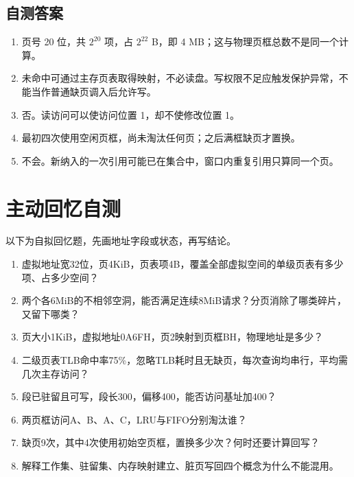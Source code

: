 \subsection{自测答案}\label{OS03-auto-6}

\begin{enumerate}
\def\labelenumi{\arabic{enumi}.}
\tightlist
\item
  页号 20 位，共 \(2^{20}\) 项，占 \(2^{22}\) B，即 4 MB；这与物理页框总数不是同一个计算。
\item
  未命中可通过主存页表取得映射，不必读盘。写权限不足应触发保护异常，不能当作普通缺页调入后允许写。
\item
  否。读访问可以使访问位置 1，却不使修改位置 1。
\item
  最初四次使用空闲页框，尚未淘汰任何页；之后满框缺页才置换。
\item
  不会。新纳入的一次引用可能已在集合中，窗口内重复引用只算同一个页。
\end{enumerate}

\section{主动回忆自测}\label{OS03-recall}

以下为自拟回忆题，先画地址字段或状态，再写结论。

\begin{recallcard}[从合法地址追踪到完整费用]

\begin{enumerate}
\def\labelenumi{\arabic{enumi}.}
\tightlist
\item
  虚拟地址宽32位，页4KiB，页表项4B，覆盖全部虚拟空间的单级页表有多少项、占多少空间？
\item
  两个各6MiB的不相邻空洞，能否满足连续8MiB请求？分页消除了哪类碎片，又留下哪类？
\item
  页大小1KiB，虚拟地址0A6FH，页2映射到页框BH，物理地址是多少？
\item
  二级页表TLB命中率75\%，忽略TLB耗时且无缺页，每次查询均串行，平均需几次主存访问？
\item
  段已驻留且可写，段长300，偏移400，能否访问基址加400？
\item
  两页框访问A、B、A、C，LRU与FIFO分别淘汰谁？
\item
  缺页9次，其中4次使用初始空页框，置换多少次？何时还要计算回写？
\item
  解释工作集、驻留集、内存映射建立、脏页写回四个概念为什么不能混用。
\end{enumerate}

\end{recallcard}

